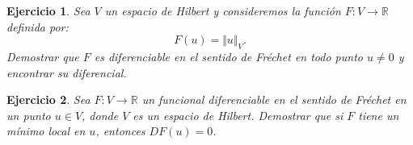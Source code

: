 \documentclass[11pt]{report}
\newtheorem{ex}{Ejercicio}
\newenvironment{solution}{\begin{proof}[Solución]}{\end{proof}}
\newcommand{\inner}[2]{( #1, #2 )_V}
\newcommand{\norma}[1]{\Vert #1 \Vert_V}
\begin{document}
\begin{ex}
Sea $V$ un espacio de Hilbert y consideremos la función $F: V \to \mathbb{R}$ definida por:
\begin{equation*}
F(u) = \norma{u}.
\end{equation*}
Demostrar que $F$ es diferenciable en el sentido de Fréchet en todo punto $u \neq 0$ y encontrar su diferencial.
\end{ex}


\begin{ex}
Sea $F: V \to \mathbb{R}$ un funcional diferenciable en el sentido de Fréchet en un punto $u \in V$, donde $V$ es un espacio de Hilbert. Demostrar que si $F$ tiene un mínimo local en $u$, entonces $DF(u) = 0$.
\end{ex}

\end{document}
